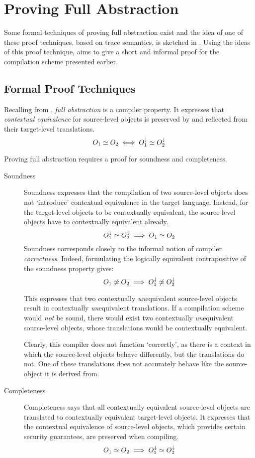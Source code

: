 \chapter{Proving Full Abstraction}
\label{chap:InformalProof}
Some formal techniques of proving full abstraction exist and the idea of one of these proof techniques, based on trace semantics, is sketched in .
Using the ideas of this proof technique,  aims to give a short and informal proof for the compilation scheme presented earlier.

\section{Formal Proof Techniques}
\label{sec:prooftechniques}
Recalling from , \emph{full abstraction} is a compiler property.
It expresses that \emph{contextual equivalence} for source-level objects is preserved by and reflected from their target-level translations.
\[
    O_{1} \simeq O_{2} \iff O_{1}^{\downarrow} \simeq O_{2}^{\downarrow}
\]

Proving full abstraction requires a proof for soundness  and completeness.
\begin{description}
\item[Soundness]
Soundness expresses that the compilation of two source-level objects does not `introduce' contextual equivalence in the target language.
Instead, for the target-level objects to be contextually equivalent, the source-level objects have to contextually equivalent already.
\[
    O_{1}^{\downarrow} \simeq O_{2}^{\downarrow} \implies O_{1} \simeq O_{2}
\]
Soundness corresponds closely to the informal notion of compiler \emph{correctness}.
Indeed, formulating the logically equivalent contrapositive of the soundness property gives:
\[
    O_{1} \not\simeq O_{2} \implies O_{1}^{\downarrow} \not\simeq O_{2}^{\downarrow}
\]

This expresses that two contextually \emph{un}equivalent source-level objects result in contextually \emph{un}equivalent translations.
If a compilation scheme would \emph{not} be sound, there would exist two contextually \emph{un}equivalent source-level objects, whose translations would be contextually equivalent.

Clearly, this compiler does not function `correctly', as there is a context in which the source-level objects behave differently, but the translations do not.
One of these translations does not accurately behave like the source-object it is derived from.
\item[Completeness]
Completeness says that all contextually equivalent source-level objects are translated to contextually equivalent target-level objects.
It expresses that the contextual equivalence of source-level objects, which provides certain security guarantees, are preserved when compiling.
\[
    O_{1} \simeq O_{2} \implies O_{1}^{\downarrow} \simeq O_{2}^{\downarrow}
\]
\end{description}

